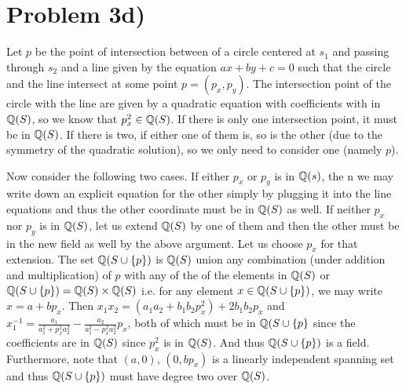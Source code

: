 \section*{Problem 3d)}
Let $p$ be the point of intersection between of a circle centered at $s_1$ and passing through $s_2$ and a line given by the equation $ax+by+c=0$ such that the circle and the line intersect at some point $p=(p_x,p_y)$. The intersection point of the circle with the line are given by a quadratic equation with coefficients with in $\mathbb{Q}(S)$, so we know that $p_x^2\in \mathbb{Q}(S)$. If there is only one intersection point, it must be in $\mathbb{Q}(S)$. If there is two, if either one of them is, so is the other (due to the symmetry of the quadratic solution), so we only need to consider one (namely $p$).\par 
Now consider the following two cases. If either $p_x$ or $p_y$ is in $\mathbb{Q}(s)$, the n we may write down an explicit equation for the other simply by plugging it into the line equations and thus the other coordinate must be in $\mathbb{Q}(S)$ as well. If neither $p_x$ nor $p_y$ is in $\mathbb{Q}(S)$, let us extend $\mathbb{Q}(S)$ by one of them and then the other must be in the new field as well by the above argument. Let us choose $p_x$ for that extension. The set $\mathbb{Q}(S \cup \{p\})$ is $\mathbb{Q}(S)$ union any combination (under addition and multiplication) of $p$ with any of the of the elements in $\mathbb{Q}(S)$ or $\mathbb{Q}(S\cup \{p\}) = \mathbb{Q}(S) \times \mathbb{Q}(S)$ i.e. for any element $x\in \mathbb{Q}(S\cup \{p\})$, we may write $x=a+bp_x$. Then $x_1x_2=(a_1a_2+b_1b_2p_x^2)+2b_1b_2p_x$ and $x_1^{-1} =  \frac{a_1}{a_1^2+p_x^2a_2^2}-\frac{a_2}{a_1^2-p_x^2a_2^2}p_x$, both of which must be in $\mathbb{Q}(S\cup \{p\}$ since the coefficients are in $\mathbb{Q}(S)$ since $p_x^2$ is in $\mathbb{Q}(S)$. And thus $\mathbb{Q}(S\cup \{p\})$ is a field. Furthermore, note that $(a,0)$, $(0,bp_x)$ is a linearly independent spanning set and thus $\mathbb{Q}(S\cup \{p\})$ must have degree two over $\mathbb{Q}(S)$.
